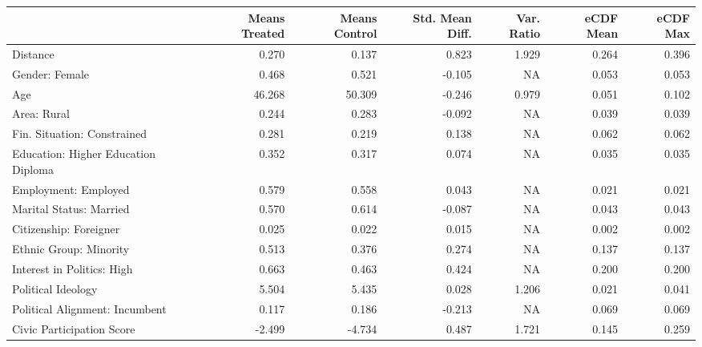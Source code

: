 \begin{table}
\centering
\begin{tabular}[t]{l|r|r|r|r|r|r}
\hline
  & Means Treated & Means Control & Std. Mean Diff. & Var. Ratio & eCDF Mean & eCDF Max\\
\hline
Distance & 0.270 & 0.137 & 0.823 & 1.929 & 0.264 & 0.396\\
\hline
Gender: Female & 0.468 & 0.521 & -0.105 & NA & 0.053 & 0.053\\
\hline
Age & 46.268 & 50.309 & -0.246 & 0.979 & 0.051 & 0.102\\
\hline
Area: Rural & 0.244 & 0.283 & -0.092 & NA & 0.039 & 0.039\\
\hline
Fin. Situation: Constrained & 0.281 & 0.219 & 0.138 & NA & 0.062 & 0.062\\
\hline
Education: Higher Education Diploma & 0.352 & 0.317 & 0.074 & NA & 0.035 & 0.035\\
\hline
Employment: Employed & 0.579 & 0.558 & 0.043 & NA & 0.021 & 0.021\\
\hline
Marital Status: Married & 0.570 & 0.614 & -0.087 & NA & 0.043 & 0.043\\
\hline
Citizenship: Foreigner & 0.025 & 0.022 & 0.015 & NA & 0.002 & 0.002\\
\hline
Ethnic Group: Minority & 0.513 & 0.376 & 0.274 & NA & 0.137 & 0.137\\
\hline
Interest in Politics: High & 0.663 & 0.463 & 0.424 & NA & 0.200 & 0.200\\
\hline
Political Ideology & 5.504 & 5.435 & 0.028 & 1.206 & 0.021 & 0.041\\
\hline
Political Alignment: Incumbent & 0.117 & 0.186 & -0.213 & NA & 0.069 & 0.069\\
\hline
Civic Participation Score & -2.499 & -4.734 & 0.487 & 1.721 & 0.145 & 0.259\\
\hline
\end{tabular}
\end{table}
